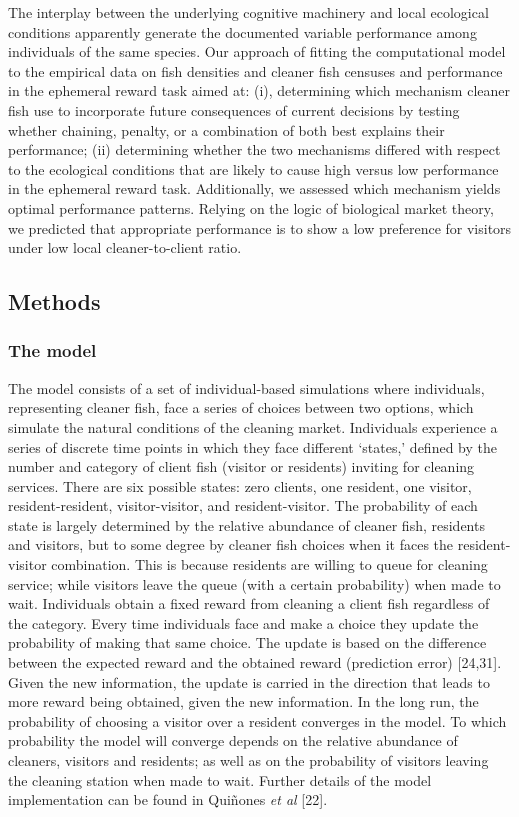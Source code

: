 \documentclass[10pt,letterpaper]{article}
\begin{document}
The interplay between the underlying cognitive machinery and local
ecological conditions apparently generate the documented variable
performance among individuals of the same species. Our approach of
fitting the computational model to the empirical data on fish densities
and cleaner fish censuses and performance in the ephemeral reward task
aimed at: (i), determining which mechanism cleaner fish use to
incorporate future consequences of current decisions by testing whether
chaining, penalty, or a combination of both best explains their
performance; (ii) determining whether the two mechanisms differed with
respect to the ecological conditions that are likely to cause high
versus low performance in the ephemeral reward task. Additionally, we
assessed which mechanism yields optimal performance patterns. Relying on
the logic of biological market theory, we predicted that appropriate
performance is to show a low preference for visitors under low local
cleaner-to-client ratio.

\hypertarget{methods}{%
\subsection{Methods}\label{methods}}

\hypertarget{the-model}{%
\subsubsection{The model}\label{the-model}}

The model consists of a set of individual-based simulations where
individuals, representing cleaner fish, face a series of choices between
two options, which simulate the natural conditions of the cleaning
market. Individuals experience a series of discrete time points in which
they face different `states,' defined by the number and category of
client fish (visitor or residents) inviting for cleaning services. There
are six possible states: zero clients, one resident, one visitor,
resident-resident, visitor-visitor, and resident-visitor. The
probability of each state is largely determined by the relative
abundance of cleaner fish, residents and visitors, but to some degree by
cleaner fish choices when it faces the resident-visitor combination.
This is because residents are willing to queue for cleaning service;
while visitors leave the queue (with a certain probability) when made to
wait. Individuals obtain a fixed reward from cleaning a client fish
regardless of the category. Every time individuals face and make a
choice they update the probability of making that same choice. The
update is based on the difference between the expected reward and the
obtained reward (prediction error) {[}24,31{]}. Given the new
information, the update is carried in the direction that leads to more
reward being obtained, given the new information. In the long run, the
probability of choosing a visitor over a resident converges in the
model. To which probability the model will converge depends on the
relative abundance of cleaners, visitors and residents; as well as on
the probability of visitors leaving the cleaning station when made to
wait. Further details of the model implementation can be found in
Quiñones \emph{et al} {[}22{]}.
\end{document}
